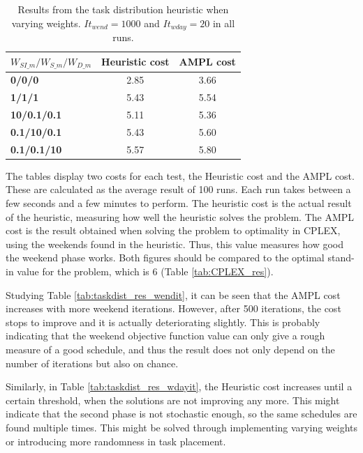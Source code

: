 \begin{table}[!h]
\centering
\caption{Results from the task distribution heuristic when varying weights. $It_{wend} = 1000$ and $It_{wday} = 20$ in all runs.}
\label{tab:taskdist_weights_res}
\begin{tabular}{|l|l|l|}
\hline
\rowcolor{Gray} \textbf{$W_{SI\_m}/W_{S\_m}/W_{D\_m}$} & \textbf{Heuristic cost} &  \textbf{AMPL cost} \\ \hline
\cellcolor{Gray} \textbf{0/0/0 }& \multicolumn{1}{c|}{2.85} & \multicolumn{1}{c|}{3.66}  \\
\cellcolor{Gray} \textbf{1/1/1} & \multicolumn{1}{c|}{5.43} & \multicolumn{1}{c|}{5.54}  \\
\cellcolor{Gray} \textbf{10/0.1/0.1} & \multicolumn{1}{c|}{5.11} & \multicolumn{1}{c|}{5.36}  \\
\cellcolor{Gray} \textbf{0.1/10/0.1} & \multicolumn{1}{c|}{5.43} & \multicolumn{1}{c|}{5.60}  \\
\cellcolor{Gray} \textbf{0.1/0.1/10} & \multicolumn{1}{c|}{5.57} & \multicolumn{1}{c|}{5.80} \\
\hline
\end{tabular}
\end{table}

The tables display two costs for each test, the Heuristic cost and the AMPL cost. These are calculated as the average result of 100 runs. Each run takes between a few seconds and a few minutes to perform. The heuristic cost is the actual result of the heuristic, measuring how well the heuristic solves the problem. The AMPL cost is the result obtained when solving the problem to optimality in CPLEX, using the weekends found in the heuristic. Thus, this value measures how good the weekend phase works. Both figures should be compared to the optimal stand-in value for the problem, which is 6 (Table \ref{tab:CPLEX_res}).

Studying Table \ref{tab:taskdist_res_wendit}, it can be seen that the AMPL cost increases with more weekend iterations. However, after 500 iterations, the cost stops to improve and it is actually deteriorating slightly. This is probably indicating that the weekend objective function value can only give a rough measure of a good schedule, and thus the result does not only depend on the number of iterations but also on chance. 

Similarly, in Table \ref{tab:taskdist_res_wdayit}, the Heuristic cost increases until a certain threshold, when the solutions are not improving any more. This might indicate that the second phase is not stochastic enough, so the same schedules are found multiple times. This might be solved through implementing varying weights or introducing more randomness in task placement.

